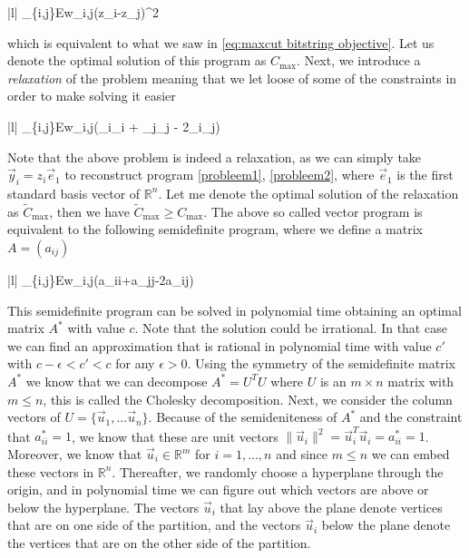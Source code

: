 \begin{maxi!}|l|
	{}{\sum_{\{i,j\}\in E}w_{i,j}(z_i-z_j)^2}
	{}{}
	\label{probleem1}
	\label{probleem2}
\end{maxi!}
which is equivalent to what we saw in \eqref{eq:maxcut bitstring objective}.
Let us denote the optimal solution of this program as $C_{\max}$. Next, we introduce a \emph{relaxation} of the problem meaning that we let loose of some of the constraints in order to make solving it easier
\begin{maxi!}|l|
	{}{\sum_{\{i,j\}\in E}w_{i,j}(_i\cdot {}_i + _j\cdot {}_j - 2_i\cdot {}_j)}
	{}{}
\end{maxi!}
Note that the above problem is indeed a relaxation, as we can simply take $\vec{y}_i = z_i \vec{e}_1$ to reconstruct program \eqref{probleem1}, \eqref{probleem2}, where $\vec{e}_1$ is the first standard basis vector of $\mathbb{R}^n$. Let me denote the optimal solution of the relaxation as $\tilde{C}_{\max}$, then we have $\tilde{C}_{\max} \geq C_{\max}$. The above so called vector program is equivalent to the following semidefinite program, where we define a matrix $A = (a_{ij})$
\begin{maxi!}|l|
	{}{\sum_{\{i,j\}\in E}w_{i,j}(a_{ii}+a_{jj}-2a_{ij})}
	{}{}
	 
\end{maxi!}

This semidefinite program can be solved in polynomial time obtaining an optimal matrix $A^*$ with value $c$. Note that the solution could be irrational. In that case we can find an approximation that is rational in polynomial time with value $c'$ with $c - \epsilon < c' < c$ for any $\epsilon > 0$. Using the symmetry of the semidefinite matrix $A^*$ we know that we can decompose $A^* = U^TU$ where $U$ is an $m \times n$  matrix with $m \leq n$, this is called the Cholesky decomposition. Next, we consider the column vectors of $U = \{\vec{u}_1,\dots \vec{u}_n\}$. Because of the semideniteness of $A^*$ and the constraint that $a_{ii}^* =1$, we know that these are unit vectors $\|\vec{u}_i\|^2 = \vec{u}_i^T\vec{u}_i = a^*_{ii} = 1$. Moreover, we know that $\vec{u}_i \in \mathbb{R}^m$ for $i = 1, \dots, n$ and since $m \leq n$ we can embed these vectors in $\mathbb{R}^n$. Thereafter, we randomly choose a hyperplane through the origin, and in polynomial time we can figure out which vectors are above or below the hyperplane. The vectors $\vec{u}_i$ that lay above the plane denote vertices that are on one side of the partition, and the vectors $\vec{u}_i$ below the plane denote the vertices that are on the other side of the partition.

